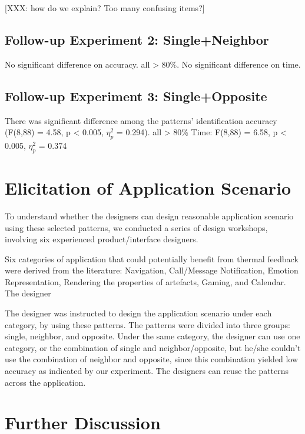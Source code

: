 \documentclass[preprint,12pt]{elsarticle}
\begin{document}
[XXX: how do we explain? Too many confusing items?]


\subsection{Follow-up Experiment 2: Single+Neighbor}
No significant difference on accuracy. all > 80\%.
No significant difference on time.

\subsection{Follow-up Experiment 3: Single+Opposite}
There was significant difference among the patterns' identification accuracy (F(8,88) = 4.58, p < 0.005, $\eta_p^2$ = 0.294). all > 80\% 
Time: F(8,88) = 6.58, p < 0.005, $\eta_p^2$ = 0.374

\section{Elicitation of Application Scenario}
To understand whether the designers can design reasonable application scenario using these selected patterns, we conducted a series of design workshops, involving six experienced product/interface designers.

Six categories of application that could potentially benefit from thermal feedback were derived from the literature: Navigation, Call/Message Notification, Emotion Representation, Rendering the properties of artefacts, Gaming, and Calendar. The designer

The designer was instructed to design the application scenario under each category, by using these patterns. The patterns were divided into three groups: single, neighbor, and opposite. Under the same category, the designer can use one category, or the combination of single and neighbor/opposite, but he/she couldn't use the combination of neighbor and opposite, since this combination yielded low accuracy as indicated by our experiment. The designers can reuse the patterns across the application.

\section{Further Discussion}
\end{document}
